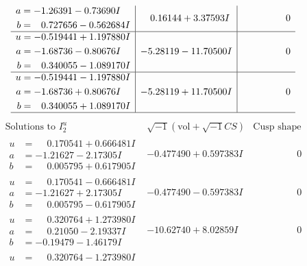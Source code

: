 \documentclass[1p]{elsarticle_modified}
\theoremstyle{definition}
\newcommand{\I}{\sqrt{-1}}
\begin{document}
$$\begin{array}{c|c|c}
\begin{aligned}
a &= -1.26391 - 0.73690 I \\
b &= \phantom{-}0.727656 - 0.562684 I\end{aligned}
 & \phantom{-}0.16144 + 3.37593 I & \phantom{-0.000000 } 0 \\ \hline\begin{aligned}
u &= -0.519441 + 1.197880 I \\
a &= -1.68736 - 0.80676 I \\
b &= \phantom{-}0.340055 - 1.089170 I\end{aligned}
 & -5.28119 - 11.70500 I & \phantom{-0.000000 } 0 \\ \hline\begin{aligned}
u &= -0.519441 - 1.197880 I \\
a &= -1.68736 + 0.80676 I \\
b &= \phantom{-}0.340055 + 1.089170 I\end{aligned}
 & -5.28119 + 11.70500 I & \phantom{-0.000000 } 0\\
 \hline 
 \end{array}$$\newpage$$\begin{array}{c|c|c}  
\text{Solutions to }I^u_{2}& \I (\text{vol} + \sqrt{-1}CS) & \text{Cusp shape}\\
 \hline 
\begin{aligned}
u &= \phantom{-}0.170541 + 0.666481 I \\
a &= -1.21627 - 2.17305 I \\
b &= \phantom{-}0.005795 + 0.617905 I\end{aligned}
 & -0.477490 + 0.597383 I & \phantom{-0.000000 } 0 \\ \hline\begin{aligned}
u &= \phantom{-}0.170541 - 0.666481 I \\
a &= -1.21627 + 2.17305 I \\
b &= \phantom{-}0.005795 - 0.617905 I\end{aligned}
 & -0.477490 - 0.597383 I & \phantom{-0.000000 } 0 \\ \hline\begin{aligned}
u &= \phantom{-}0.320764 + 1.273980 I \\
a &= \phantom{-}0.21050 - 2.19337 I \\
b &= -0.19479 - 1.46179 I\end{aligned}
 & -10.62740 + 8.02859 I & \phantom{-0.000000 } 0 \\ \hline\begin{aligned}
u &= \phantom{-}0.320764 - 1.273980 I \\

\end{aligned}
\end{array}$$
\end{document}
